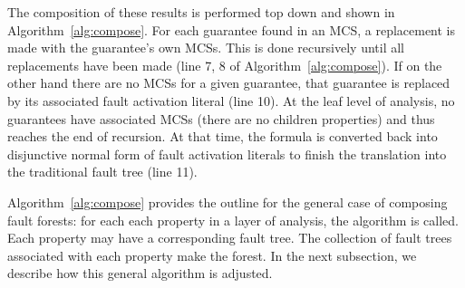 The composition of these results is performed top down and shown in Algorithm~\ref{alg:compose}. For each guarantee found in an MCS, a replacement is made with the guarantee's own MCSs. This is done recursively until all replacements have been made (line 7, 8 of Algorithm~\ref{alg:compose}). If on the other hand there are no MCSs for a given guarantee, that guarantee is replaced by its associated fault activation literal (line 10). At the leaf level of analysis, no guarantees have associated MCSs (there are no children properties) and thus reaches the end of recursion. At that time, the formula is converted back into disjunctive normal form of fault activation literals to finish the translation into the traditional fault tree (line 11). 

Algorithm~\ref{alg:compose} provides the outline for the general case of composing fault forests: for each each property in a layer of analysis, the algorithm is called. Each property may have a corresponding fault tree. The collection of fault trees associated with each property make the forest. In the next subsection, we describe how this general algorithm is adjusted.

